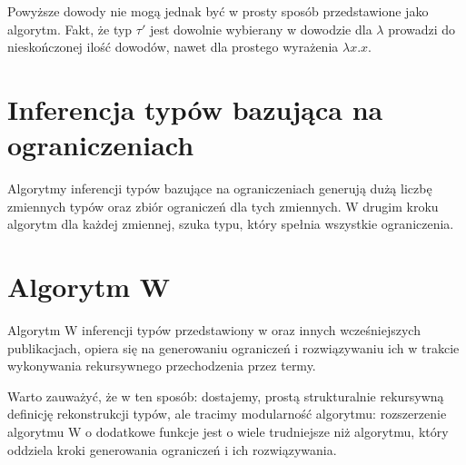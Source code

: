 \documentclass[a4paper,12pt]{book} %
\begin{document}
Powyższe dowody nie mogą jednak być w prosty sposób przedstawione jako algorytm. Fakt, że typ $\tau'$ jest dowolnie wybierany w dowodzie dla $\lambda$ prowadzi do nieskończonej ilość dowodów, nawet dla prostego wyrażenia $\lambda x.x$.
\section{Inferencja typów bazująca na ograniczeniach}
Algorytmy inferencji typów bazujące na ograniczeniach generują dużą liczbę zmiennych typów oraz zbiór ograniczeń dla tych zmiennych. W drugim kroku algorytm dla każdej zmiennej, szuka typu, który spełnia wszystkie ograniczenia.
\section{Algorytm W}
Algorytm W inferencji typów przedstawiony w \cite{Milner__1978} oraz innych wcześniejszych publikacjach, opiera się na generowaniu ograniczeń i rozwiązywaniu ich w trakcie wykonywania rekursywnego przechodzenia przez termy.

Warto zauważyć, że w ten sposób: dostajemy, prostą strukturalnie rekursywną definicję rekonstrukcji typów, ale tracimy modularność algorytmu: rozszerzenie algorytmu W o dodatkowe funkcje jest o wiele trudniejsze niż algorytmu, który oddziela kroki generowania ograniczeń i ich rozwiązywania.
\end{document}
